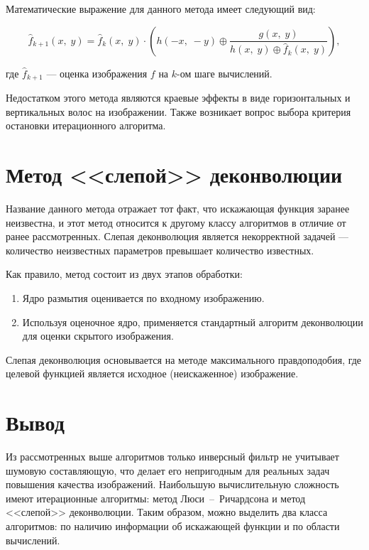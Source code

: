 Математические выражение для данного метода имеет следующий вид:

\begin{equation}
	\hat{f}_{k+1}(x,\;y) = \hat{f}_k(x,\;y)\cdot \left( h(-x,\;-y) \oplus \frac{g(x,\;y)}{h(x,\;y) \oplus \hat{f}_k(x,\;y)} \right),
\end{equation}

где $\hat{f}_{k+1}$ --- оценка изображения $f$ на $k$-ом шаге вычислений. 

Недостатком этого метода являются краевые эффекты в виде горизонтальных и вертикальных волос на изображении. Также возникает вопрос выбора критерия остановки итерационного алгоритма.

\section{Метод <<слепой>> деконволюции}

Название данного метода отражает тот факт, что искажающая функция заранее неизвестна, и этот метод относится к другому классу алгоритмов в отличие от ранее рассмотренных. Слепая деконволюция является некорректной задачей --- количество неизвестных параметров превышает количество известных.

Как правило, метод состоит из двух этапов обработки:

\begin{enumerate}
    \item Ядро размытия оценивается по входному изображению.
    \item Используя оценочное ядро, применяется стандартный алгоритм деконволюции для оценки скрытого изображения.
\end{enumerate}

Слепая деконволюция основывается на методе максимального правдоподобия, где целевой функцией является исходное (неискаженное) изображение.

\section*{Вывод}

Из рассмотренных выше алгоритмов только инверсный фильтр не учитывает шумовую составляющую, что делает его непригодным для реальных задач повышения качества изображений. Наибольшую вычислительную сложность имеют итерационные алгоритмы: метод Люси~--~Ричардсона и метод <<слепой>> деконволюции. Таким образом, можно выделить два класса алгоритмов: по наличию информации об искажающей функции и по области вычислений.